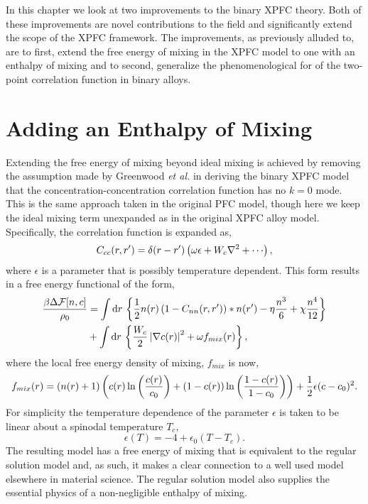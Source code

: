 \label{chapter:improvements}

In this chapter we look at two improvements to the binary XPFC theory. Both of
these improvements are novel contributions to the field and significantly
extend the scope of the XPFC framework. The improvements, as previously alluded
to, are to first, extend the free energy of mixing in the XPFC model to one
with an enthalpy of mixing and to second, generalize the phenomenological
for of the two-point correlation function in binary alloys.

\section{Adding an Enthalpy of Mixing} %

Extending the free energy of mixing beyond ideal mixing is achieved by removing
the assumption made by Greenwood \textit{et al.} in deriving the binary XPFC
model that the concentration-concentration correlation function has no $k=0$
mode. This is the same approach taken in the original PFC model, though here we
keep the ideal mixing term unexpanded as in the original XPFC alloy model.
Specifically, the correlation function is expanded as,
%
\begin{equation}
    C_{cc}(r, r^\prime) = \d(r - r^\prime)
        \l(\omega\epsilon + W_c\nabla^2 + \cdots\r),
\end{equation}
%
where $\epsilon$ is a parameter that is possibly temperature dependent. This
form results in a free energy functional of the form,
%
\begin{align}
    \frac{\beta\Delta\mathcal{F}[n, c]}{\rho_0} &= \int \mathrm{d}r\, \left\lbrace
        \frac{1}{2} n(r) \left(1 - C_{nn}(r, r^\prime)\right) \ast n(r^\prime)
        - \eta \frac{n^3}{6} + \chi \frac{n^4}{12} \right\rbrace \\
        &+ \int \mathrm{d}r\,\left\lbrace
            \frac{W_c}{2}\left\vert \nabla c(r) \right\vert^2 + \omega f_{mix}(r)
            \right\rbrace, \nonumber
\end{align}
%
where the local free energy density of mixing, $f_{mix}$ is now,
%
\begin{equation}
    f_{mix}(r) = \left(n(r) + 1\right)\left(
            c(r)\ln\left(\frac{c(r)}{c_0}\right)
          + (1-c(r))\ln\left(\frac{1-c(r)}{1-c_0}\right) \right)
          + \frac{1}{2} \epsilon (c - c_0)^2.
\end{equation}
%
For simplicity the temperature dependence of the parameter $\epsilon$ is taken
to be linear about a spinodal temperature $T_c$,
%
\begin{equation}
    \label{eq:spinodal_model}
    \epsilon(T) = -4 + \epsilon_0(T - T_c).
\end{equation}
%
The resulting model has a free energy of mixing that is equivalent to the
regular solution model and, as such, it makes a clear connection to a well used
model elsewhere in material science. The regular solution model also supplies
the essential physics of a non-negligible enthalpy of mixing. 


